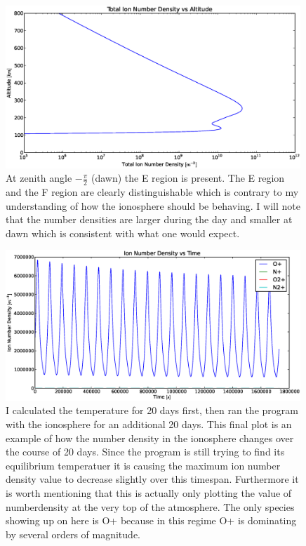 \documentclass[10pt]{article}
\begin{document}
\begin{figure}[H]
	\centering
		\includegraphics[width=0.99\textwidth]{./dawn/B/Total_Ion_Number_Density_vs_Altitude_100_800.eps}
	\caption{At zenith angle $-\frac{\pi}{2}$ (dawn) the E region is present. The E region and the F region are clearly distinguishable which is contrary to my understanding of how the ionosphere should be behaving. I will note that the number densities are larger during the day and smaller at dawn which is consistent with what one would expect.}
	\label{fig:tot2}
\end{figure}
\begin{figure}[H]
	\centering
		\includegraphics[width=0.99\textwidth]{./noon/B/Ion_Number_Density_vs_time.eps}
	\caption{I calculated the temperature for 20 days first, then ran the program with the ionosphere for an additional 20 days. This final plot is an example of how the number density in the ionosphere changes over the course of 20 days. Since the program is still trying to find its equilibrium temperatuer it is causing the maximum ion number density value to decrease slightly over this timespan. Furthermore it is worth mentioning that this is actually only plotting the value of numberdensity at the very top of the atmosphere. The only species showing up on here is O+ because in this regime O+ is dominating by several orders of magnitude.}
	\label{fig:nvt1}
\end{figure}
\end{document}
